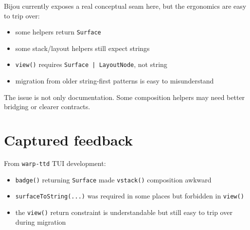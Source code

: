 Bijou currently exposes a real conceptual seam here, but the ergonomics are easy to trip over:

\begin{itemize}
\tightlist
\item
  some helpers return \texttt{S\allowbreak{}u\allowbreak{}r\allowbreak{}f\allowbreak{}a\allowbreak{}c\allowbreak{}e}
\item
  some stack/layout helpers still expect strings
\item
  \texttt{v\allowbreak{}i\allowbreak{}e\allowbreak{}w\allowbreak{}(\allowbreak{})} requires \texttt{S\allowbreak{}u\allowbreak{}r\allowbreak{}f\allowbreak{}a\allowbreak{}c\allowbreak{}e\allowbreak{} \allowbreak{}|\allowbreak{} \allowbreak{}L\allowbreak{}a\allowbreak{}y\allowbreak{}o\allowbreak{}u\allowbreak{}t\allowbreak{}N\allowbreak{}o\allowbreak{}d\allowbreak{}e}, not string
\item
  migration from older string-first patterns is easy to misunderstand
\end{itemize}

The issue is not only documentation. Some composition helpers may need better bridging or clearer contracts.

\section{Captured feedback}\label{record-336-captured-feedback}

From \texttt{w\allowbreak{}a\allowbreak{}r\allowbreak{}p\allowbreak{}-\allowbreak{}t\allowbreak{}t\allowbreak{}d} TUI development:

\begin{itemize}
\tightlist
\item
  \texttt{b\allowbreak{}a\allowbreak{}d\allowbreak{}g\allowbreak{}e\allowbreak{}(\allowbreak{})} returning \texttt{S\allowbreak{}u\allowbreak{}r\allowbreak{}f\allowbreak{}a\allowbreak{}c\allowbreak{}e} made \texttt{v\allowbreak{}s\allowbreak{}t\allowbreak{}a\allowbreak{}c\allowbreak{}k\allowbreak{}(\allowbreak{})} composition awkward
\item
  \texttt{s\allowbreak{}u\allowbreak{}r\allowbreak{}f\allowbreak{}a\allowbreak{}c\allowbreak{}e\allowbreak{}T\allowbreak{}o\allowbreak{}S\allowbreak{}t\allowbreak{}r\allowbreak{}i\allowbreak{}n\allowbreak{}g\allowbreak{}(\allowbreak{}.\allowbreak{}.\allowbreak{}.\allowbreak{})} was required in some places but forbidden in \texttt{v\allowbreak{}i\allowbreak{}e\allowbreak{}w\allowbreak{}(\allowbreak{})}
\item
  the \texttt{v\allowbreak{}i\allowbreak{}e\allowbreak{}w\allowbreak{}(\allowbreak{})} return constraint is understandable but still easy to trip over during migration
\end{itemize}

